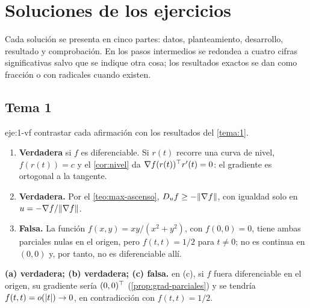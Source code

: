 \chapter{Soluciones de los ejercicios}
\label{ap:soluciones}

Cada solución se presenta en cinco partes: datos, planteamiento, desarrollo, resultado y comprobación. En los pasos intermedios se redondea a cuatro cifras significativas salvo que se indique otra cosa; los resultados exactos se dan como fracción o con radicales cuando existen.

\section{Tema 1}

\begin{solucion}{eje:1-vf}
\planteamiento contrastar cada afirmación con los resultados del \cref{tema:1}.
\pasos
\begin{enumerate}[label=(\alph*)]
  \item \textbf{Verdadera} si $f$ es diferenciable. Si $r(t)$ recorre una curva de nivel, $f(r(t))=c$ y el \cref{cor:nivel} da $\nabla f(r(t))^{\top} r'(t)=0$: el gradiente es ortogonal a la tangente.
  \item \textbf{Verdadera.} Por el \cref{teo:max-ascenso}, $D_uf\ge-\lVert\nabla f\rVert$, con igualdad solo en $u=-\nabla f/\lVert\nabla f\rVert$.
  \item \textbf{Falsa.} La función $f(x,y)=xy/(x^{2}+y^{2})$, con $f(0,0)=0$, tiene ambas parciales nulas en el origen, pero $f(t,t)=1/2$ para $t\ne 0$; no es continua en $(0,0)$ y, por tanto, no es diferenciable allí.
\end{enumerate}
\resultado \textbf{(a) verdadera; (b) verdadera; (c) falsa.}
\comprobacion en (c), si $f$ fuera diferenciable en el origen, su gradiente sería $(0,0)^{\top}$ (\cref{prop:grad-parciales}) y se tendría $f(t,t)=o(\lvert t\rvert)\to 0$, en contradicción con $f(t,t)=1/2$.
\end{solucion}


